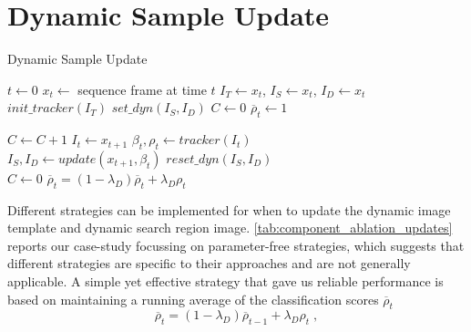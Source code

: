 \section{Dynamic Sample Update} \label{sec:methods_update} 
\begin{algorithm}[h]
  \centering
  \caption{Dynamic Sample Update}\label{alg:dynamic_update}
  \begin{algorithmic}
    \State $t \gets 0$
    \State $x_t \gets $ sequence frame at time $t$
    \State $I_T \gets x_t$, $I_S \gets x_t$, $I_D \gets x_t$
    \State $init\_tracker(I_T)$ 
    \State $set\_dyn(I_S, I_D)$ 
    \State $C \gets 0$ 
    \State $\overline{\rho}_t \gets 1$ 
  
      \State $C \gets C+1$ 
      \State $I_t \gets x_{t+1}$  
      \State ${\beta}_t, {\rho}_t \gets tracker(I_t)$ 
      \State {}
        \\ 
            \State $I_S, I_D \gets update(x_{t+1}, {\beta}_t)$ %
            \State $reset\_dyn(I_S, I_D)$ \\ 
            \State $C \gets 0$
      \EndIf 
      \State $\overline{\rho }_t = (1-{\lambda}_{D}) \overline{\rho}_{t} +  {\lambda}_{D} {\rho}_t$ \\ 
      \EndWhile
  \end{algorithmic}
\end{algorithm}
Different strategies can be implemented for when to update the dynamic image template and dynamic search region image. \ref{tab:component_ablation_updates} reports our case-study focussing on parameter-free strategies, which suggests that different strategies are specific to their approaches and are not generally applicable. A simple yet effective strategy that gave us reliable performance is based on maintaining a running average of the classification scores $\overline{\rho }_t$
\begin{equation}
  \label{eq:sample_update}
          \overline{\rho }_t = (1-{\lambda}_{D}) \overline{\rho}_{t-1} +  {\lambda}_{D} {\rho}_t \; ,
\end{equation}
